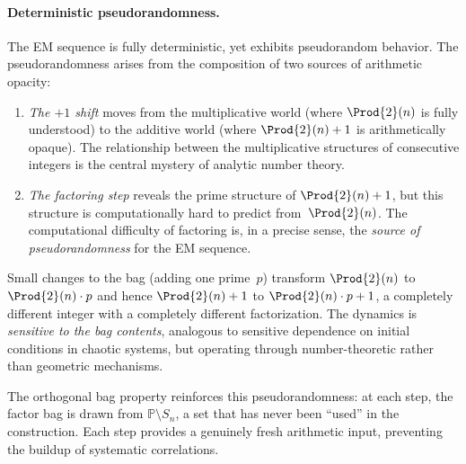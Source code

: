 \paragraph{Deterministic pseudorandomness.}
The EM sequence is fully deterministic, yet exhibits pseudorandom
behavior.  The pseudorandomness arises from the composition of two
sources of arithmetic opacity:
\begin{enumerate}[nosep]
\item \emph{The $+1$ shift} moves from the multiplicative world (where
  $\Prod{2}(n)$ is fully understood) to the additive world (where
  $\Prod{2}(n)+1$ is arithmetically opaque).  The relationship between the
  multiplicative structures of consecutive integers is the central
  mystery of analytic number theory.
\item \emph{The factoring step} reveals the prime structure of
  $\Prod{2}(n)+1$, but this structure is computationally hard to predict
  from~$\Prod{2}(n)$.  The computational difficulty of factoring is, in a
  precise sense, the \emph{source of pseudorandomness} for the EM
  sequence.
\end{enumerate}
Small changes to the bag (adding one prime~$p$) transform $\Prod{2}(n)$ to
$\Prod{2}(n) \cdot p$ and hence $\Prod{2}(n)+1$ to $\Prod{2}(n) \cdot p + 1$, a
completely different integer with a completely different factorization.
The dynamics is \emph{sensitive to the bag contents}, analogous to
sensitive dependence on initial conditions in chaotic systems, but
operating through number-theoretic rather than geometric mechanisms.

The orthogonal bag property reinforces this pseudorandomness: at each
step, the factor bag is drawn from $\mathbb{P} \setminus S_n$, a set
that has never been ``used'' in the construction.  Each step provides a
genuinely fresh arithmetic input, preventing the buildup of systematic
correlations.
